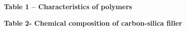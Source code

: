 {\bfseries Table 1 -- Characteristics of polymers}


{\bfseries Table 2- Chemical composition of carbon-silica filler}

